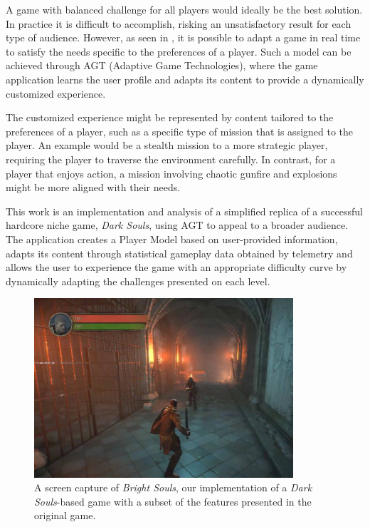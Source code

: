 A game with balanced challenge for all players would ideally be the best solution. In practice it is difficult to accomplish, risking an unsatisfactory result for each type of audience. However, as seen in \cite{ARTICLE_PlayerCentredGameDesign}, it is possible to adapt a game in real time to satisfy the needs specific to the preferences of a player. Such a model can be achieved through AGT (Adaptive Game Technologies), where the game application learns the user profile and adapts its content to provide a dynamically customized experience.

The customized experience might be represented by content tailored to the preferences of a player, such as a specific type of mission that is assigned to the player. An example would be a stealth mission to a more strategic player, requiring the player to traverse the environment carefully. In contrast, for a player that enjoys action, a mission involving chaotic gunfire and explosions might be more aligned with their needs.

This work is an implementation and analysis of a simplified replica of a successful hardcore niche game, \emph{Dark Souls}, using AGT to appeal to a broader audience. The application creates a Player Model based on user-provided information, adapts its content through statistical gameplay data obtained by telemetry and allows the user to experience the game with an appropriate difficulty curve by dynamically adapting the challenges presented on each level.

\begin{figure}[!h]
    \caption{A screen capture of \emph{Bright Souls}, our implementation of a \emph{Dark Souls}-based game with a subset of the features presented in the original game.}
    \begin{center}
        \includegraphics[width=26em]{figures/fig-bright-souls.jpg}
    \end{center}
    \label{fig:ex1}
\end{figure}

